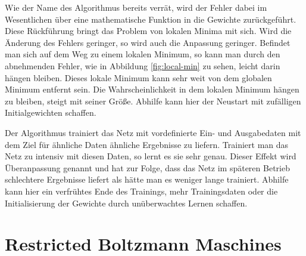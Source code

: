 Wie der Name des Algorithmus bereits verrät, wird der Fehler dabei im Wesentlichen über eine mathematische Funktion in die Gewichte zurückgeführt. Diese Rückführung bringt das Problem von lokalen Minima mit sich. Wird die Änderung des Fehlers geringer, so wird auch die Anpassung geringer. Befindet man sich auf dem Weg zu einem lokalen Minimum, so kann man durch den abnehmenden Fehler, wie in Abbildung \ref{fig:local-min} zu sehen, leicht darin hängen bleiben. Dieses lokale Minimum kann sehr weit von dem globalen Minimum entfernt sein. Die Wahrscheinlichkeit in dem lokalen Minimum hängen zu bleiben, steigt mit seiner Größe. Abhilfe kann hier der Neustart mit zufälligen Initialgewichten schaffen.

Der Algorithmus trainiert das Netz mit vordefinierte Ein- und Ausgabedaten mit dem Ziel für ähnliche Daten ähnliche Ergebnisse zu liefern. Trainiert man das Netz zu intensiv mit diesen Daten, so lernt es sie sehr genau. Dieser Effekt wird Überanpassung genannt und hat zur Folge, dass das Netz im späteren Betrieb schlechtere Ergebnisse liefert als hätte man es weniger lange trainiert. Abhilfe kann hier ein verfrühtes Ende des Trainings, mehr Trainingsdaten oder die Initialisierung der Gewichte durch unüberwachtes Lernen schaffen.

\section{Restricted Boltzmann Maschines}

